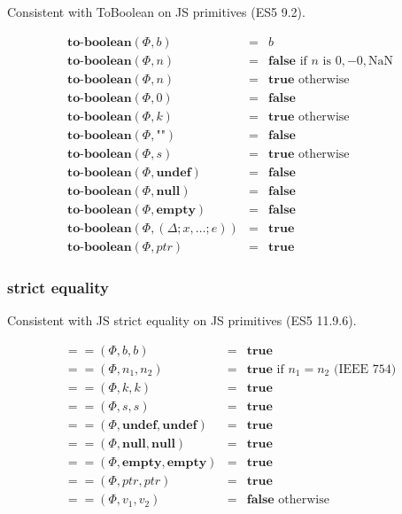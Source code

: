 \documentclass[draft, 10pt]{article}
\newcommand{\expr}[0]{e}
\newcommand{\var}[0]{x}
\newcommand{\bool}[0]{b}
\newcommand{\num}[0]{n}
\newcommand{\intg}[0]{k}
\newcommand{\str}[0]{s}
\newcommand{\nan}[0]{\textrm{NaN}}
\newcommand{\undef}[0]{\textbf{undef}}
\newcommand{\nul}[0]{\textbf{null}}
\newcommand{\empt}[0]{\textbf{empty}}
\newcommand{\true}[0]{\textbf{true}}
\newcommand{\false}[0]{\textbf{false}}
\newcommand{\optobool}[0]{\textbf{to-boolean}}
\newcommand{\opstxeq}[0]{==}
\newcommand{\varenv}[0]{\Delta}
\newcommand{\heap}[0]{\Phi}
\newcommand{\closure}[3]{(#1; #2; #3)}
\newcommand{\bigval}[0]{v}
\newcommand{\heapptr}{ptr}
\newcommand{\rununop}[3]{#1(#2,#3)}
\newcommand{\runbinop}[4]{#1(#2,#3,#4)}
\begin{document}
Consistent with ToBoolean on JS primitives (ES5 9.2).

\[
\begin{array}{rcl}
\rununop{\optobool}{\heap}{\bool} &=& \bool \\
\rununop{\optobool}{\heap}{\num} &=& \false \textrm{ if $\num$ is $0, -0, \nan$} \\
\rununop{\optobool}{\heap}{\num} &=& \true \textrm{ otherwise} \\
\rununop{\optobool}{\heap}{0} &=& \false \\
\rununop{\optobool}{\heap}{\intg} &=& \true \textrm{ otherwise} \\
\rununop{\optobool}{\heap}{\texttt{""}} &=& \false \\
\rununop{\optobool}{\heap}{\str} &=& \true \textrm{ otherwise} \\
\rununop{\optobool}{\heap}{\undef} &=& \false \\
\rununop{\optobool}{\heap}{\nul} &=& \false \\
\rununop{\optobool}{\heap}{\empt} &=& \false \\
\rununop{\optobool}{\heap}{\closure{\varenv}{\var, \dots}{\expr}} &=& \true \\
\rununop{\optobool}{\heap}{\heapptr} &=& \true
\end{array}
\]

\subsubsection{strict equality}

Consistent with JS strict equality on JS primitives (ES5 11.9.6).

\[
\begin{array}{rcl}
\runbinop{\opstxeq}{\heap}{\bool}{\bool} &=& \true \\
\runbinop{\opstxeq}{\heap}{\num_1}{\num_2} &=& \true \textrm{ if $\num_1 = \num_2$ (IEEE 754)} \\
\runbinop{\opstxeq}{\heap}{\intg}{\intg} &=& \true \\
\runbinop{\opstxeq}{\heap}{\str}{\str} &=& \true \\
\runbinop{\opstxeq}{\heap}{\undef}{\undef} &=& \true \\
\runbinop{\opstxeq}{\heap}{\nul}{\nul} &=& \true \\
\runbinop{\opstxeq}{\heap}{\empt}{\empt} &=& \true \\
\runbinop{\opstxeq}{\heap}{\heapptr}{\heapptr} &=& \true \\
\runbinop{\opstxeq}{\heap}{\bigval_1}{\bigval_2} &=& \false \textrm{ otherwise} 
\end{array}
\]
\end{document}
